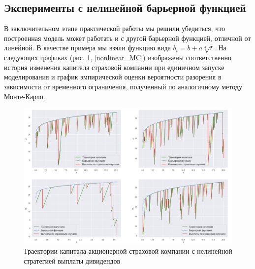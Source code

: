 \documentclass{article}
\theoremstyle{plain}
\theoremstyle{plain}
\theoremstyle{plain}
\theoremstyle{plain}
\theoremstyle{definition}
\theoremstyle{remark}
\begin{document}
\clearpage

\subsection{Эксперименты с нелинейной барьерной функцией}

В заключительном этапе практической работы мы решили убедиться, что построенная модель может работать и с другой барьерной функцией, отличной от линейной. В качестве примера мы взяли функцию вида $b_t = b + a \sqrt[4]{t}$. На следующих графиках (рис. \ref{nonlinear_stock_trajectory}, \ref{nonlinear_MC}) изображены соответственно история изменения капитала страховой компании при единичном запуске моделирования и график эмпирической оценки вероятности разорения в зависимости от временного ограничения, полученный по аналогичному методу Монте-Карло.

\begin{figure}[h]
\centering
\includegraphics[scale=0.5]{images/nonlinear_barrier_trajectory.png}
\captionsetup{justification=centering}
\caption{Траектории капитала акционерной страховой компании с нелинейной стратегией выплаты дивидендов}
\label{nonlinear_stock_trajectory}
\end{figure}
\end{document}
